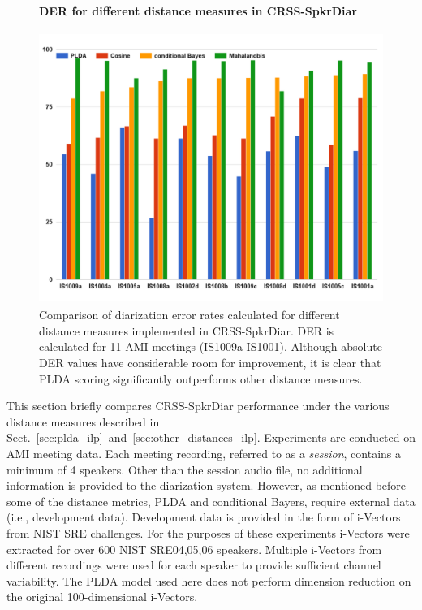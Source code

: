 \begin{figure}[b!]
	\vspace{2mm}
	\centering
	\textbf{DER for different distance measures in CRSS-SpkrDiar}\par\medskip
	\includegraphics[height = 3.5in, width=1\textwidth]{figures/crssdiar_distances_der}
	\caption{ \small Comparison of diarization error rates calculated for different distance measures implemented in CRSS-SpkrDiar. DER is calculated for 11 AMI meetings (IS1009a-IS1001). Although absolute DER values have considerable room for improvement, it is clear that PLDA scoring significantly outperforms other distance measures.}
	\label{fig:ch5_compare_crssdiar_distances}
\end{figure}

This section briefly compares CRSS-SpkrDiar performance under the various distance measures described in Sect.~\ref{sec:plda_ilp}~and~\ref{sec:other_distances_ilp}. 
Experiments are conducted on AMI meeting data. 
Each meeting recording, referred to as a {\it session}, contains a minimum of 4 speakers. 
Other than the session audio file, no additional information is provided to the diarization system. 
However, as mentioned before some of the distance metrics, PLDA and conditional Bayers, require external data (i.e., development data). 
Development data is provided in the form of i-Vectors from NIST SRE challenges. 
For the purposes of these experiments i-Vectors were extracted for over 600 NIST SRE04,05,06 speakers. 
Multiple i-Vectors from different recordings were used for each speaker to provide sufficient channel variability. 
The PLDA model used here does not perform dimension reduction on the original 100-dimensional i-Vectors. 

